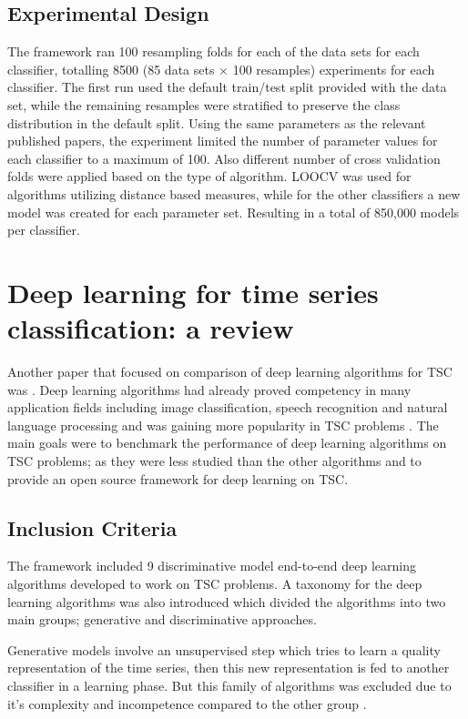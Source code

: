 \subsection{Experimental Design}
\label{subsectionUniBakeoffExperiment}
The framework ran 100 resampling folds for each of the data sets for each classifier, totalling 8500 (85 data sets $\times$ 100 resamples) experiments for each classifier.
The first run used the default train/test split provided with the data set, while the remaining resamples were stratified to preserve the class distribution in the default split.
Using the same parameters as the relevant published papers, the experiment limited the number of parameter values for each classifier to a maximum of 100.
Also different number of cross validation folds were applied based on the type of algorithm. LOOCV was used for algorithms utilizing distance based measures,
while for the other classifiers a new model was created for each parameter set. Resulting in a total of 850,000 models per classifier.

\section{Deep learning for time series classification: a review}
\label{DeepLearningReview}
Another paper that focused on comparison of deep learning algorithms for TSC was \cite{fawaz2019deepreview}.
Deep learning algorithms had already proved competency in many application fields including image classification, speech recognition and natural language processing \cite{he2016deep,santos2016literature,krizhevsky2012imagenet,guan2019towards}
and was gaining more popularity in TSC problems \cite{zheng2014time,zheng2016exploiting,zhao2017convolutional}.
The main goals were to benchmark the performance of deep learning algorithms on TSC problems; as they were less studied than the other algorithms and to provide an open source framework for deep learning on TSC.

\subsection{Inclusion Criteria}
\label{subsectionDeepLearningReviewInclusion}
The framework included 9 discriminative model end-to-end deep learning algorithms developed to work on TSC problems.
A taxonomy for the deep learning algorithms was also introduced which divided the algorithms into two main groups; generative and discriminative approaches.

Generative models involve an unsupervised step which tries to learn a quality representation of the time series, then this new representation is fed to another classifier in a learning phase.
But this family of algorithms was excluded due to it's complexity and incompetence compared to the other group \cite{le2017time,bagnall2017great}.

